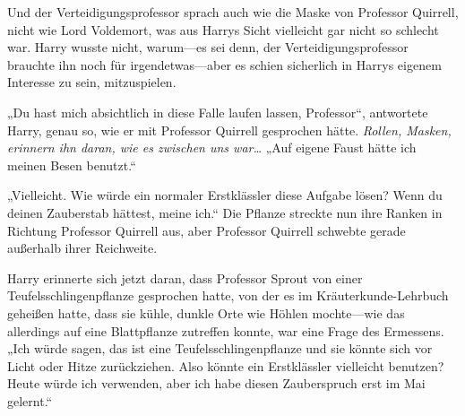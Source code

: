 Und der Verteidigungsprofessor sprach auch wie die Maske von Professor Quirrell, nicht wie Lord Voldemort, was aus Harrys Sicht vielleicht gar nicht so schlecht war. Harry wusste nicht, warum—es sei denn, der Verteidigungsprofessor brauchte ihn noch für irgendetwas—aber es schien sicherlich in Harrys eigenem Interesse zu sein, mitzuspielen.

„Du hast mich absichtlich in diese Falle laufen lassen, Professor“, antwortete Harry, genau so, wie er mit Professor Quirrell gesprochen hätte.
\emph{Rollen, Masken, erinnern ihn daran, wie es zwischen uns war…}
„Auf eigene Faust hätte ich meinen Besen benutzt.“

„Vielleicht. Wie würde ein normaler Erstklässler diese Aufgabe lösen? Wenn du deinen Zauberstab hättest, meine ich.“
Die Pflanze streckte nun ihre Ranken in Richtung Professor Quirrell aus, aber Professor Quirrell schwebte gerade außerhalb ihrer Reichweite.

Harry erinnerte sich jetzt daran, dass Professor Sprout von einer Teufelsschlingenpflanze gesprochen hatte, von der es im Kräuterkunde-Lehrbuch geheißen hatte, dass sie kühle, dunkle Orte wie Höhlen mochte—wie das allerdings auf eine Blattpflanze zutreffen konnte, war eine Frage des Ermessens.
„Ich würde sagen, das ist eine Teufelsschlingenpflanze und sie könnte sich vor Licht oder Hitze zurückziehen. Also könnte ein Erstklässler vielleicht  benutzen? Heute würde ich  verwenden, aber ich habe diesen Zauberspruch erst im Mai gelernt.“

